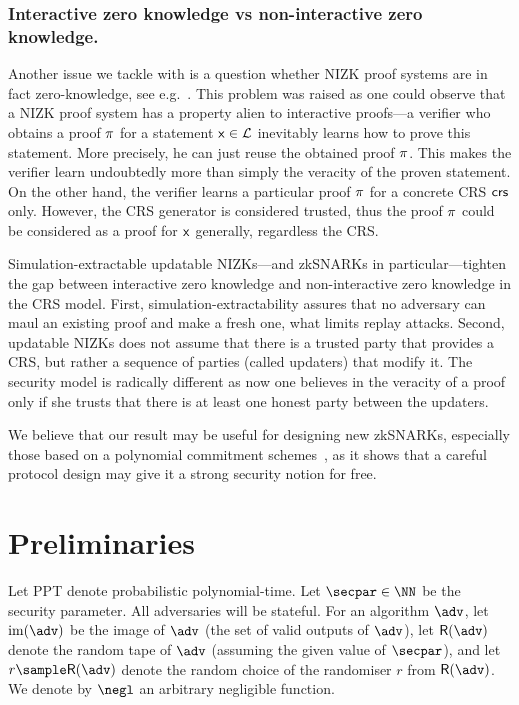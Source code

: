 \documentclass[runningheads,11pt]{llncs}
\theoremstyle{definition}
\begin{document}
\subsubsection{Interactive zero knowledge vs non-interactive zero knowledge.}
Another issue we tackle with is a question whether NIZK proof systems are in fact zero-knowledge, see e.g.~\cite{C:Pass03}. This problem was raised as one could observe that a NIZK proof system has a property alien to interactive proofs---a verifier who obtains a proof $\pi$ for a statement $\mathsf{x} \in \mathcal{L}$ inevitably learns how to prove this statement. More precisely, he can just reuse the obtained proof $\pi$. This makes the verifier learn undoubtedly more than simply the veracity of the proven statement. On the other hand, the verifier learns a particular proof $\pi$ for a concrete CRS $\mathsf{crs}$ only. However, the CRS generator is considered trusted, thus the proof $\pi$ could be considered as a proof for $\mathsf{x}$ generally, regardless the CRS.

Simulation-extractable updatable NIZKs---and zkSNARKs in particular---tighten
the gap between interactive zero knowledge and non-interactive zero knowledge in
the CRS model. First, simulation-extractability assures that no adversary can
maul an existing proof and make a fresh one, what limits replay attacks. Second,
updatable NIZKs does not assume that there is a trusted party that provides a
CRS, but rather a sequence of parties (called updaters) that modify it. The
security model is radically different as now one believes in the veracity of a
proof only if she trusts that there is at least one honest party between the
updaters. 

We believe that our result may be useful for designing new zkSNARKs, especially those based on a polynomial commitment schemes~\cite{AC:KatZavGol10}, as it shows that a careful protocol design may give it a strong security notion for free.

\section{Preliminaries}
Let PPT denote probabilistic polynomial-time.
Let $\secpar \in \NN$ be the security parameter.
All adversaries will be stateful.
For an algorithm $\adv$, let $\image (\adv)$ be the image of $\adv$ (the set of valid outputs of $\adv$), let $\RND{\adv}$ denote the random tape of $\adv$ (assuming the given value of $\secpar$), and let $r \sample \RND{\adv}$ denote the random choice of the randomiser $r$ from $\RND{\adv}$.
We denote by $\negl$ an arbitrary negligible function.
\end{document}
